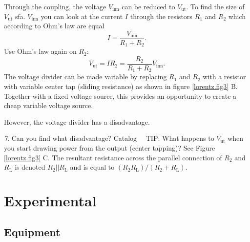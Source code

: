 \documentclass[../Elmag-labhefte-2020.tex]{subfiles}
\begin{document}
%
Through the coupling, the voltage $V_\mathrm{inn}$ can be reduced to $V_\mathrm{ut}$. To find the size of $V_\mathrm{ut}$ sfa. $V_\mathrm{inn}$ you can look at the current $I$ through the resistors $R_1$ and $R_2$ which according to Ohm's law are equal
\begin{equation}
    I = \frac{V_\mathrm{inn}}{R_1 + R_2} .
\end{equation}
Use Ohm's law again on $R_2$:
\begin{equation}
    V_\mathrm{ut} 
        = I  R_2 
        = \frac{R_2}{R_1 + R_2} V_\mathrm{inn}.
\end{equation}
The voltage divider can be made variable by replacing $R_1$ and $R_2$ with a resistor with variable center tap (sliding resistance) as shown in figure \ref{lorentz.fig3} B. Together with a fixed voltage source, this provides an opportunity to create a cheap variable voltage source.

However, the voltage divider has a disadvantage.

{\emph 7. Can you find what disadvantage? }
Catalog \ \
TIP: What happens to $V_\mathrm{ut}$ when you start drawing power from the output (center tapping)? See Figure \ref{lorentz.fig3} C. The resultant resistance across the parallel connection of $R_2$ and $R_\mathrm{L}$ is denoted $R_2||R_\mathrm{L}$ and is equal to $ (R_2R_\mathrm{L})/(R_2 + R_\mathrm{L})$.



\section{Experimental \label{ch.lorentz.eksp}}

\subsection{Equipment}
\end{document}
